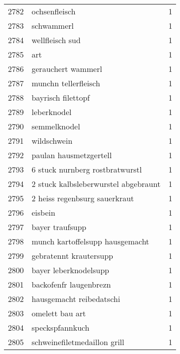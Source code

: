 \begin{tabular}{llr}
2782 &                                      ochsenfleisch &      1 \\
2783 &                                         schwammerl &      1 \\
2784 &                                    wellfleisch sud &      1 \\
2785 &                                                art &      1 \\
2786 &                                 gerauchert wammerl &      1 \\
2787 &                               munchn tellerfleisch &      1 \\
2788 &                                 bayrisch filettopf &      1 \\
2789 &                                        leberknodel &      1 \\
2790 &                                       semmelknodel &      1 \\
2791 &                                        wildschwein &      1 \\
2792 &                             paulan hausmetzgertell &      1 \\
2793 &                    6 stuck nurnberg rostbratwurstl &      1 \\
2794 &               2 stuck kalbsleberwurstel abgebraunt &      1 \\
2795 &                      2 heiss regenbsurg sauerkraut &      1 \\
2796 &                                            eisbein &      1 \\
2797 &                                    bayer traufsupp &      1 \\
2798 &                    munch kartoffelsupp hausgemacht &      1 \\
2799 &                             gebratennt krautersupp &      1 \\
2800 &                              bayer leberknodelsupp &      1 \\
2801 &                             backofenfr laugenbrezn &      1 \\
2802 &                           hausgemacht reibedatschi &      1 \\
2803 &                                    omelett bau art &      1 \\
2804 &                                    speckspfannkuch &      1 \\
2805 &                       schweinefiletmedaillon grill &      1 \\

\end{tabular}
